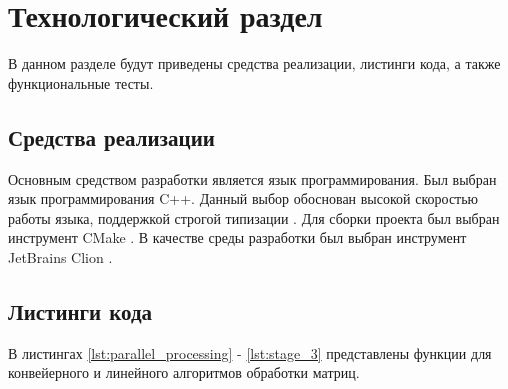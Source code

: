 \chapter{Технологический раздел}
\label{cha:impl}



В данном разделе будут приведены средства реализации, листинги кода, а также функциональные тесты.


\section{Средства реализации}

Основным средством разработки является язык программирования. Был выбран язык программирования C++. Данный выбор обоснован высокой скоростью работы языка, поддержкой строгой типизации \cite{cpplang}. Для сборки проекта был выбран инструмент CMake \cite{cmake}.  В качестве среды разработки был выбран инструмент JetBrains Clion \cite{clion}.


\section{Листинги кода}

В листингах \ref{lst:parallel_processing} - \ref{lst:stage_3} представлены функции для конвейерного и линейного алгоритмов обработки матриц.














